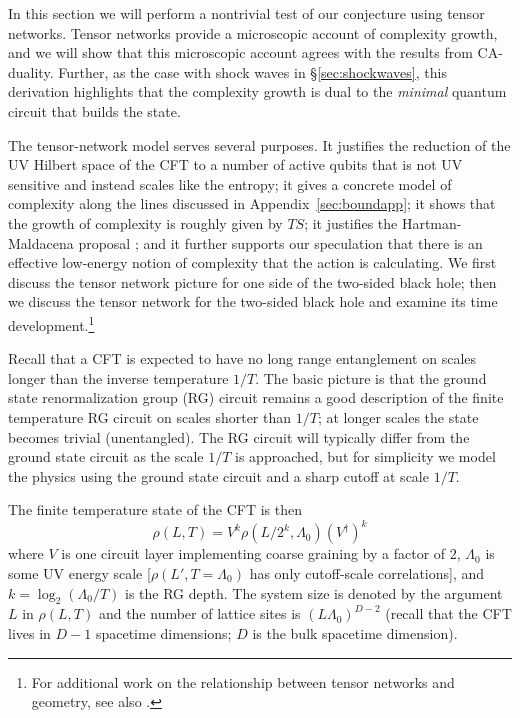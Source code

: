 \documentclass[12pt]{article}
\numberwithin{equation}{section}
\newcommand{\beq}{\begin{equation}}
\newcommand{\eeq}{\end{equation}}
\def\({\left(}
\def\){\right)}
\begin{document}
In this section we will perform a nontrivial test of our conjecture using tensor networks. Tensor networks provide a microscopic account of complexity growth, and we will show that this microscopic account  agrees with the results from CA-duality. Further, as the case with shock waves in \S\ref{sec:shockwaves}, this derivation highlights that the complexity growth is dual to the \emph{minimal} quantum circuit that builds the state.


The tensor-network model serves several purposes. It justifies the reduction of the UV Hilbert space of the CFT to a number of active qubits that is not UV sensitive and instead scales like the entropy; it gives a concrete model of complexity along the lines discussed in Appendix~\ref{sec:boundapp}; it shows that the growth of complexity is roughly given by $TS$; it justifies the Hartman-Maldacena proposal \cite{hartmanmaldacena}; and it further supports our speculation that there is an effective low-energy notion of complexity that the action is calculating. We first discuss the tensor network picture for one side of the two-sided black hole; then we discuss the tensor network for the two-sided black hole and  examine its time development.\footnote{For additional work on the relationship between tensor networks and geometry, see also \cite{entrenholo,Swingle:2012wq,vidal_tns_geo,Pastawski:2015qua,Czech:2015qta,Czech:2015xna,Yang:2015uoa,Casini:2015zua}.}

Recall that a CFT is expected to have no long range entanglement on scales longer than the inverse temperature $1/T$. The basic picture is that the ground state renormalization group (RG) circuit remains a good description of the finite temperature RG circuit on scales shorter than $1/T$; at longer scales the state becomes trivial (unentangled). The RG circuit will typically differ from the ground state circuit as the scale $1/T$ is approached, but for simplicity we model the physics using the ground state circuit and a sharp cutoff at scale $1/T$.

The finite temperature state of the CFT is then
\beq
\rho(L,T) = V^k \rho(L/2^k,\Lambda_0)\( V^\dagger\)^k
\eeq
where $V$ is one circuit layer implementing coarse graining by a factor of $2$, $\Lambda_0$ is some UV energy scale [$\rho(L',T=\Lambda_0)$  has only cutoff-scale correlations], and $k = \log_2(\Lambda_0/T)$ is the RG depth. The system size is denoted by the argument $L$ in $\rho(L,T)$ and the number of lattice sites is $(L\Lambda_0)^{D-2}$ (recall that the CFT lives in $D-1$ spacetime dimensions; $D$ is the bulk spacetime dimension).
\end{document}
